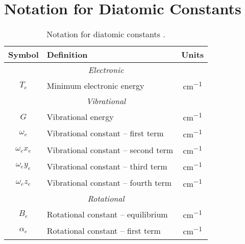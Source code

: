 \chapter{Notation for Diatomic Constants}
\label{a:notation_for_diatomic_constants}

\begin{table}[H]
    \centering
    \caption{Notation for diatomic constants \cite{herzbergMolecularSpectraMolecular1950,nistDiatomicSpectralDatabase2018a,nistDiatomicSpectralDatabase2018}.}
    \label{t:notation}
    \begin{tabular}{clc}
        \toprule
        Symbol            & Definition                                                                   & Units            \\
        \midrule
        \multicolumn{3}{c}{\textit{Electronic}}                                                                             \\
        \cmidrule(lr){1-3}
        $T_e$           & Minimum electronic energy                                                    & \unit{cm^{-1}}   \\
        \multicolumn{3}{c}{\textit{Vibrational}}                                                                            \\
        \cmidrule(lr){1-3}
        $G$               & Vibrational energy                                                           & \unit{cm^{-1}}   \\
        $\omega_e$      & Vibrational constant -- first term                                           & \unit{cm^{-1}}   \\
        $\omega_ex_e$ & Vibrational constant -- second term                                          & \unit{cm^{-1}}   \\
        $\omega_ey_e$ & Vibrational constant -- third term                                           & \unit{cm^{-1}}   \\
        $\omega_ez_e$ & Vibrational constant -- fourth term                                          & \unit{cm^{-1}}   \\
        \multicolumn{3}{c}{\textit{Rotational}}                                                                             \\
        \cmidrule(lr){1-3}
        $B_e$           & Rotational constant -- equilibrium                                           & \unit{cm^{-1}}   \\
        $\alpha_e$      & Rotational constant -- first term                                            & \unit{cm^{-1}}   \\

\end{tabular}
\end{table}
